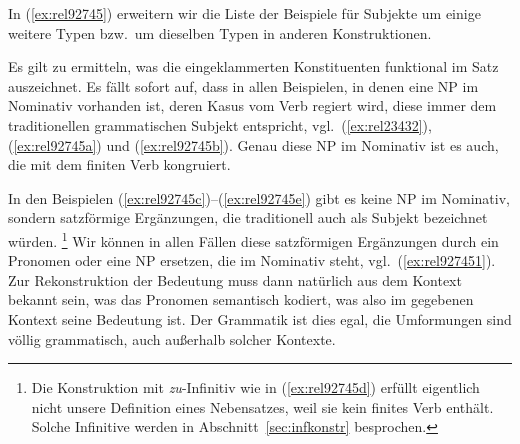 In (\ref{ex:rel92745}) erweitern wir die Liste der Beispiele für Subjekte um einige weitere Typen bzw.\ um dieselben Typen in anderen Konstruktionen.

\begin{exe}
  \ex\label{ex:rel92745}
  \begin{xlist}
  \end{xlist}
\end{exe}

Es gilt zu ermitteln, was die eingeklammerten Konstituenten funktional im Satz auszeichnet.
Es fällt sofort auf, dass in allen Beispielen, in denen eine NP im Nominativ vorhanden ist, deren Kasus vom Verb regiert wird, diese immer dem traditionellen grammatischen Subjekt entspricht, vgl.\ (\ref{ex:rel23432}), (\ref{ex:rel92745a}) und (\ref{ex:rel92745b}).
Genau diese NP im Nominativ ist es auch, die mit dem finiten Verb kongruiert.

In den Beispielen (\ref{ex:rel92745c})--(\ref{ex:rel92745e}) gibt es keine NP im Nominativ, sondern satzförmige Ergänzungen, die traditionell auch als Subjekt bezeichnet würden.%
\footnote{Die Konstruktion mit \textit{zu}-Infinitiv wie in (\ref{ex:rel92745d}) erfüllt eigentlich nicht unsere Definition eines Nebensatzes, weil sie kein finites Verb enthält.
Solche Infinitive werden in Abschnitt~\ref{sec:infkonstr} besprochen.}
Wir können in allen Fällen diese satzförmigen Ergänzungen durch ein Pronomen oder eine NP ersetzen, die im Nominativ steht, vgl.\ (\ref{ex:rel927451}).
Zur Rekonstruktion der Bedeutung muss dann natürlich aus dem Kontext bekannt sein, was das Pronomen semantisch kodiert, was also im gegebenen Kontext seine Bedeutung ist.
Der Grammatik ist dies egal, die Umformungen sind völlig grammatisch, auch außerhalb solcher Kontexte.

\begin{exe}
  \ex\label{ex:rel927451}
  \begin{xlist}
  \end{xlist}
\end{exe}

